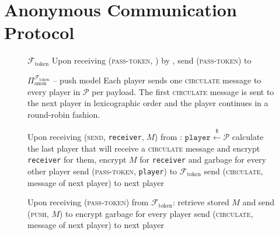 \section{Anonymous Communication Protocol}
  \label{sec:anonprot}

  \begin{figure}[H]
    \begin{systembox}{$\mathcal{F}_{\mathrm{token}}$}
      Upon receiving (\textsc{pass-token}, \bob) by \alice, send
      (\textsc{pass-token}) to \bob
    \end{systembox}
    \caption{}
    \label{alg:tokenfunc}
  \end{figure}

  \begin{figure}[H]
    \begin{protocolbox}{$\Pi_{\mathrm{anon}}^{\mathcal{F}_{\mathrm{token}}}$ --
    push model}
      Each player sends one \textsc{circulate} message to every player in
      $\mathcal{P}$ per payload. The first
      \textsc{circulate} message is sent to the next player in lexicographic
      order and the player continues in a round-robin fashion. 
      \begin{algorithmic}[1]
        \State Upon receiving (\textsc{send}, \texttt{receiver}, $M$) from
        \environment:
        \Indent
          \State $\mathtt{player} \overset{\$}{\gets} \mathcal{P}$
          \State calculate the last player that will receive a
          \textsc{circulate} message and encrypt \texttt{receiver} for them,
          encrypt $M$ for \texttt{receiver} and garbage for every other player
            \State send (\textsc{pass-token}, \texttt{player}) to
            $\mathcal{F}_{\mathrm{token}}$
          \Else
            \State send (\textsc{circulate}, message of next player) to next
            player
          \EndIf
        \EndIndent
        \Statex

        \State Upon receiving (\textsc{pass-token}) from
        $\mathcal{F}_{\mathrm{token}}$:
        \Indent
            \State retrieve stored $M$ and send (\textsc{push}, $M$) to
            \environment
          \Else
            \State encrypt garbage for every player
            \State send (\textsc{circulate}, message of next player) to next
            player
          \EndIf
        \EndIndent
        \Statex


\end{algorithmic}
\end{protocolbox}
\end{figure}
